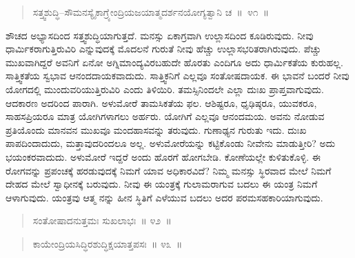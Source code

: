 \newpage

\vspace{-0.45cm}

\begin{verse}
ಸತ್ತ್ವಶುದ್ಧಿ–ಸೌಮನಸ್ಯೈಕಾಗ್ರ್ಯೇಂದ್ರಿಯಜಯಾತ್ಮದರ್ಶನಯೋಗ್ಯತ್ವಾನಿ ಚ~॥~೪೧~॥
\end{verse}

\vspace{-0.35cm}


\vspace{0.1cm}


ಶೌಚದ ಅಭ್ಯಾಸದಿಂದ ಸತ್ತ್ವಶುದ್ಧಿಯಾಗುತ್ತದೆ. ಮನಸ್ಸು ಏಕಾಗ್ರವಾಗಿ ಉಲ್ಲಾಸದಿಂದ ಕೂಡಿರುವುದು. ನೀವು ಧಾರ್ಮಿಕರಾಗುತ್ತಿರುವಿರಿ ಎನ್ನುವುದಕ್ಕೆ ಮೊದಲನೆ ಗುರುತೆ ನೀವು ಹೆಚ್ಚು ಉಲ್ಲಾಸಭರಿತರಾಗಿರುವುದು. ಪೆಚ್ಚು ಮುಖವಾಗಿದ್ದರೆ ಅವನಿಗೆ ಏನೋ ಅಗ್ನಿಮಾಂದ್ಯವಿರಬಹುದೇ ಹೊರತು ಎಂದಿಗೂ ಅದು ಧಾರ್ಮಿಕತೆಯ ಕುರುಹಲ್ಲ. ಸಾತ್ತ್ವಿಕತೆಯ ಸ್ವಭಾವ ಆನಂದದಾಯಕವಾದುದು. ಸಾತ್ತ್ವಿಕನಿಗೆ ಎಲ್ಲವೂ ಸಂತೋಷದಾಯಕ. ಈ ಭಾವನೆ ಬಂದರೆ ನೀವು ಯೋಗದಲ್ಲಿ ಮುಂದುವರಿಯುತ್ತಿರುವಿರಿ ಎಂದು ತಿಳಿಯಿರಿ. ತಮಸ್ಸಿನಿಂದಲೇ ಎಲ್ಲಾ ದುಃಖ ಪ್ರಾಪ್ತವಾಗುವುದು. ಆದಕಾರಣ ಅದರಿಂದ ಪಾರಾಗಿ. ಅಳುಮೋರೆ ತಾಮಸಿಕತೆಯ ಫಲ. ಆಶಿಷ್ಟರೂ, ಧೃಢಿಷ್ಠರೂ, ಯುವಕರೂ, ಸಾಹಸಪ್ರಿಯರೂ ಮಾತ್ರ ಯೋಗಿಗಳಾಗಲು ಅರ್ಹರು. ಯೋಗಿಗೆ ಎಲ್ಲವೂ ಆನಂದ\break ಮಯ. ಅವನು ನೋಡುವ ಪ್ರತಿಯೊಂದು ಮಾನವನ ಮುಖವೂ ಮಂದಹಾಸವನ್ನು ತರುವುದು. ಗುಣಾಢ್ಯನ ಗುರುತು ಇದು. ದುಃಖ ಪಾಪದಿಂದಾದುದು, ಮತ್ತಾವುದರಿಂದಲೂ ಅಲ್ಲ. ಅಳುಮೋರೆಯನ್ನು ಕಟ್ಟಿಕೊಂಡು ನೀವೇನು ಮಾಡುತ್ತೀರಿ? ಅದು ಭಯಂಕರವಾದುದು. ಅಳುಮೋರೆ ಇದ್ದರೆ ಅಂದು ಹೊರಗೆ ಹೋಗಬೇಡಿ. ಕೋಣೆಯಲ್ಲೇ ಕುಳಿತುಕೊಳ್ಳಿ. ಈ ರೋಗವನ್ನು ಪ್ರಪಂಚಕ್ಕೆ ಹರಡುವುದಕ್ಕೆ ನಿಮಗೆ ಯಾವ ಅಧಿಕಾರವಿದೆ? ನಿಮ್ಮ ಮನಸ್ಸು ಸ್ಥಿರವಾದ ಮೇಲೆ ನಿಮಗೆ ದೇಹದ ಮೇಲೆ ಸ್ವಾಧೀನಕ್ಕೆ  ಬರುವುದು. ನೀವು ಈ ಯಂತ್ರಕ್ಕೆ ಗುಲಾಮರಾಗುವ ಬದಲು ಈ ಯಂತ್ರ ನಿಮಗೆ ಆಳಾಗುವುದು. ಯಂತ್ರವು ಆತ್ಮ ನನ್ನು ಹೀನ ಸ್ಥಿತಿಗೆ ಎಳೆಯುವ ಬದಲು ಅದರ ಪರಮಸಹಕಾರಿಯಾಗುವುದು. 

\vspace{-0.25cm}

\begin{verse}
ಸಂತೋಷಾದನುತ್ತಮಃ ಸುಖಲಾಭಃ~॥ ೪೨~॥
\end{verse}

\vspace{-0.4cm}


\vspace{0.1cm}

\vspace{-0.25cm}

\begin{verse}
ಕಾಯೇಂದ್ರಿಯಸಿದ್ಧಿರಶುದ್ಧಿಕ್ಷಯಾತ್ತಪಸಃ~॥ ೪೩~॥
\end{verse}

